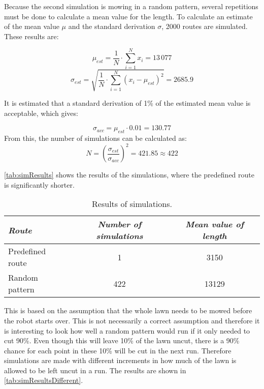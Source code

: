 Because the second simulation is mowing in a random pattern, several repetitions must be done to calculate a mean value for the length.
To calculate an estimate of the mean value $\mu$ and the standard derivation $\sigma$, 2000 routes are simulated. These results are:

\begin{equation}
\mu_{est} = \frac{1}{N}\cdot\sum_{i=1}^N x_i= 13\,077
\end{equation}
\begin{equation}
\sigma_{est} = \sqrt{ \frac{1}{N}\cdot\sum_{i=1}^N (x_i-\mu_{est})^2} = 2685.9 
\end{equation}


It is estimated that a standard derivation of 1\% of the estimated mean value is acceptable, which gives:

\begin{equation}
\sigma_{acc} = \mu_{est}\cdot 0.01 =130.77
\end{equation}
From this, the number of simulations can be calculated as: 
\begin{equation}
N = \left(\frac{\sigma_{est}}{\sigma_{acc}}\right)^2=421.85\approx 422
\end{equation}
\startexplain
{}
\stopexplain

\autoref{tab:simResults} shows the results of the simulations, where the predefined route is significantly shorter.

\begin{table}[htb]
\centering
\caption{Results of simulations.}
\label{tab:simResults}
	\begin{tabular}{l c c}
	\textit{Route} & \textit{Number of simulations} & \textit{Mean value of length}\\ \toprule \rowcolor{lightGrey}
	Predefined route & 1 & 3150\\
	Random pattern & 422 & 13129
	\end{tabular}
\end{table}

This is based on the assumption that the whole lawn needs to be mowed before the robot starts over. This is not necessarily a correct assumption and therefore it is interesting to look how well a random pattern would run if it only needed to cut 90\%. Even though this will leave 10\% of the lawn uncut, there is a 90\% chance for each point in these 10\% will be cut in the next run. Therefore simulations are made with different increments in how much of the lawn is allowed to be left uncut in a run. The results are shown in \autoref{tab:simResultsDifferent}.

